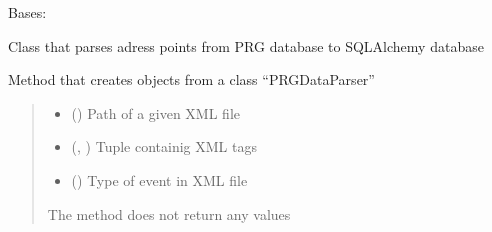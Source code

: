 \documentclass[letterpaper,10pt,english]{sphinxmanual}
\begin{document}
\begin{fulllineitems}
\label{\detokenize{pcm_parser:pcm_parser.PRGDataParser}}
\pysigstartsignatures
{}
\pysigstopsignatures
\sphinxAtStartPar
Bases: 

\sphinxAtStartPar
Class that parses adress points from PRG database to SQLAlchemy database

\begin{fulllineitems}
\label{\detokenize{pcm_parser:pcm_parser.PRGDataParser.__init__}}
\pysigstartsignatures
{}
\pysigstopsignatures
\sphinxAtStartPar
Method that creates objects from a class “PRGDataParser”
\begin{quote}\begin{description}
\begin{itemize}
\item {} 
\sphinxAtStartPar
{} () \textendash{} Path of a given XML file

\item {} 
\sphinxAtStartPar
{} (\sphinxcode{\sphinxupquote{Tuple}}{[}, \sphinxcode{\sphinxupquote{...}}{]}) \textendash{} Tuple containig XML tags

\item {} 
\sphinxAtStartPar
{} () \textendash{} Type of event in XML file

\end{itemize}

\sphinxAtStartPar
The method does not return any values

\end{description}\end{quote}

\end{fulllineitems}


\end{fulllineitems}
\end{document}
